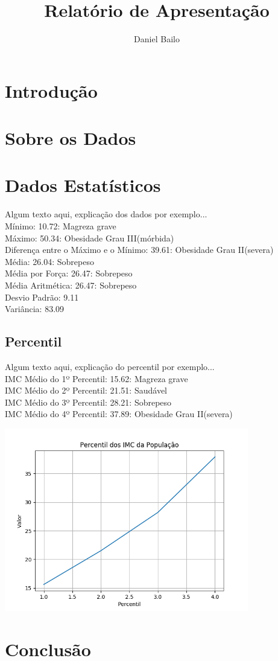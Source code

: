 \documentclass[a4paper, 10pt]{article}
\title{Relatório de Apresentação}
\author{Daniel Bailo}
\begin{document}
\maketitle

\section{Introdução}
\lipsum[1]

\section{Sobre os Dados}
\lipsum[2]

\newpage

\section{Dados Estatísticos}

Algum texto aqui, explicação dos dados por exemplo...\\
Mínimo: 10.72: Magreza grave\\
Máximo: 50.34: Obesidade Grau III(mórbida)\\
Diferença entre o Máximo e o Mínimo: 39.61: Obesidade Grau II(severa)\\
Média: 26.04: Sobrepeso\\
Média por Força: 26.47: Sobrepeso\\
Média Aritmética: 26.47: Sobrepeso\\
Desvio Padrão: 9.11\\
Variância: 83.09

\subsection{Percentil}

Algum texto aqui, explicação do percentil por exemplo...\\
IMC Médio do 1º Percentil: 15.62: Magreza grave\\
IMC Médio do 2º Percentil: 21.51: Saudável\\
IMC Médio do 3º Percentil: 28.21: Sobrepeso\\
IMC Médio do 4º Percentil: 37.89: Obesidade Grau II(severa)\\

\begin{center}
	\includegraphics[width=0.8\textwidth]{percentil.png}
	
\end{center}

\section{Conclusão}
\lipsum[3]
\end{document}
